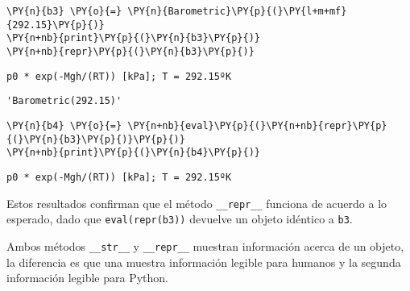 \begin{tcolorbox}[breakable, size=fbox, boxrule=1pt, pad at break*=1mm,colback=cellbackground, colframe=cellborder]
\begin{Verbatim}[commandchars=\\\{\}]
\PY{n}{b3} \PY{o}{=} \PY{n}{Barometric}\PY{p}{(}\PY{l+m+mf}{292.15}\PY{p}{)}
\PY{n+nb}{print}\PY{p}{(}\PY{n}{b3}\PY{p}{)}
\PY{n+nb}{repr}\PY{p}{(}\PY{n}{b3}\PY{p}{)}
\end{Verbatim}
\end{tcolorbox}

\begin{Verbatim}[commandchars=\\\{\}]
p0 * exp(-Mgh/(RT)) [kPa]; T = 292.15ºK
\end{Verbatim}

\begin{tcolorbox}[breakable, size=fbox, boxrule=.5pt, pad at break*=1mm, opacityfill=0]
\begin{Verbatim}[commandchars=\\\{\}]
'Barometric(292.15)'
\end{Verbatim}
\end{tcolorbox}
        
\begin{tcolorbox}[breakable, size=fbox, boxrule=1pt, pad at break*=1mm,colback=cellbackground, colframe=cellborder]
\begin{Verbatim}[commandchars=\\\{\}]
\PY{n}{b4} \PY{o}{=} \PY{n+nb}{eval}\PY{p}{(}\PY{n+nb}{repr}\PY{p}{(}\PY{n}{b3}\PY{p}{)}\PY{p}{)}
\PY{n+nb}{print}\PY{p}{(}\PY{n}{b4}\PY{p}{)}
\end{Verbatim}
\end{tcolorbox}

\begin{Verbatim}[commandchars=\\\{\}]
p0 * exp(-Mgh/(RT)) [kPa]; T = 292.15ºK
\end{Verbatim}

Estos resultados confirman que el método \texttt{\_\_repr\_\_} funciona
de acuerdo a lo esperado, dado que \texttt{eval(repr(b3))} devuelve un
objeto idéntico a \texttt{b3}.

Ambos métodos \texttt{\_\_str\_\_} y \texttt{\_\_repr\_\_} muestran
información acerca de un objeto, la diferencia es que una muestra
información legible para humanos y la segunda información legible para
Python.

